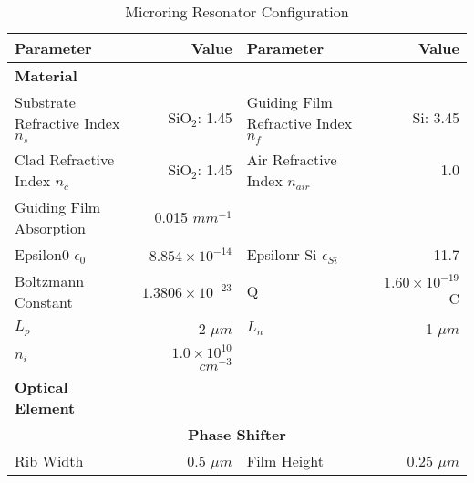 \documentclass[\projectroot/template.tex]{subfiles}
\begin{document}
	
\begin{table}[!h]
\fontsize{9}{11}\selectfont
\centering
\caption{Microring Resonator Configuration}
\label{tab:setup-MR}
	\begin{tabular}{l @{\hskip-20pt}r @{\hskip10pt}l @{\hskip-30pt}r}
		\textbf{Parameter}                  & \textbf{Value}                & \textbf{Parameter}                  & \textbf{Value}                \\ \toprule
		\textbf{Material}                   &                               &                                     &                               \\ \toprule
		Substrate Refractive Index $n_s$    & SiO$_2$: 1.45                 & Guiding Film Refractive Index $n_f$ & Si: 3.45                      \\
		Clad Refractive Index $n_c$         & SiO$_2$: 1.45                 & Air Refractive Index $n_{air}$      & 1.0                           \\
		Guiding Film Absorption             & 0.015 $mm^{-1}$               &                                     &                               \\
		Epsilon0 $\epsilon_0$               & $8.854\times 10^{-14}$        & Epsilonr-Si $\epsilon_{Si}$         & 11.7                          \\
		Boltzmann Constant                  & $1.3806\times 10^{-23}$       & Q                                   & $1.60\times 10^{-19} $ C      \\
		$L_p$                               & 2 $\mu m$                     & $L_n$                               & 1 $\mu m$                     \\
		$n_i$                               & $1.0\times 10^{10}$ $cm^{-3}$ &                                     &                               \\ \toprule
		\textbf{Optical Element}            &                               &                                     &                               \\ \toprule
		\multicolumn{4}{c}{\textbf{Phase Shifter}}                                                 \\
		Rib Width                           & 0.5 $\mu m$                   & Film Height                         & 0.25 $\mu m$                  \\

\end{tabular}
\end{table}
\end{document}
